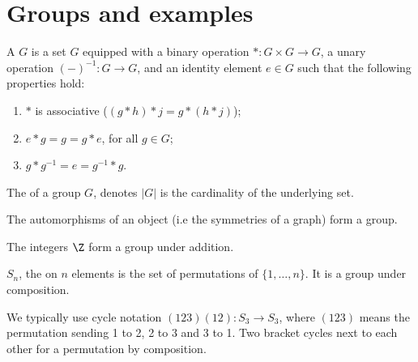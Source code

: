 \documentclass[12pt]{report}
\begin{document}
\section{Groups and examples}

\begin{definition}\label{def:intro-to-group-theory:group}
  A  \(G\) is a set \(G\) equipped with a binary operation \(* : G \times G \to G\), a unary operation \((-)^{-1}: G \to G\), and an identity element \(e \in G\) such that the following properties hold:

  \begin{enumerate}
    \item \(*\) is associative (\((g * h) * j = g * (h * j)\));
    \item \(e * g = g = g * e\), for all \(g \in G\);
    \item \(g * g^{-1} = e = g^{-1} * g\).
  \end{enumerate}

  The  of a group \(G\), denotes \(|G|\) is the cardinality of the underlying set.
\end{definition}


\begin{example}
  The automorphisms of an object (i.e the symmetries of a graph) form a group.
\end{example}


\begin{example}
  The integers \(\Z\) form a group under addition.
\end{example}


\begin{example}\label{ex:group-theory:symmetric-group}
  \(S_{n}\), the  on \(n\) elements is the set of permutations of \(\{1, \ldots, n\}\).
  It is a group under composition.


  We typically use cycle notation \((123)(12): S_{3} \to S_{3}\), where \((123)\) means the permutation sending 1 to 2, 2 to 3 and 3 to 1.
  Two bracket cycles next to each other for a permutation by composition.
\end{example}
\end{document}

